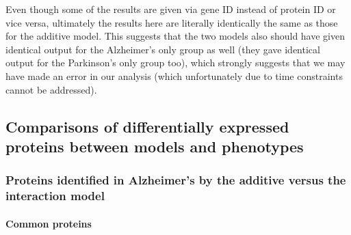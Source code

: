 Even though some of the results are given via gene ID instead of protein ID or vice versa, ultimately the results here are literally identically the same as those for the additive model. This suggests that the two models also should have given identical output for the Alzheimer's only group as well (they gave identical output for the Parkinson's only group too), which strongly suggests that we may have made an error in our analysis (which unfortunately due to time constraints cannot be addressed).

\subsection{Comparisons of differentially expressed proteins between models and phenotypes}
\label{sec:comp-diff-expr}

\subsubsection{Proteins identified in Alzheimer's by the additive versus the interaction model}
\label{sec:prot-ident-alzh}

\paragraph{Common proteins}

